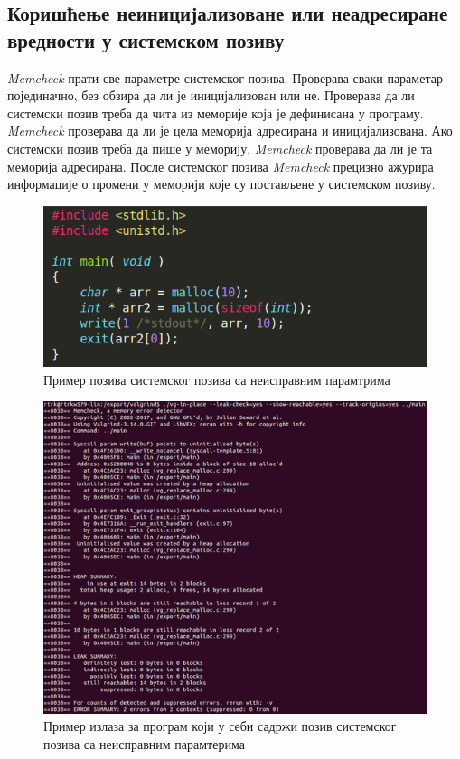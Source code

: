 \documentclass[12pt,oneside]{memoir}
\begin{document}
\subsection{Коришћење неиницијализоване или неадресиране вредности у системском позиву}

\indent \textit{Memcheck} прати све параметре системског позива.  Проверава сваки параметар појединачно, без обзира да ли је иницијализован или не. Проверава да ли системски позив треба да чита из меморије која је дефинисана у програму. \textit{Memcheck} проверава да ли је цела меморија адресирана и иницијализована. Ако системски позив треба да пише у меморију, \textit{Memcheck} проверава да ли је та меморија адресирана. После системског позива \textit{Memcheck} прецизно ажурира информације о промени у меморији које су постављене у системском позиву.

\begin{figure}[h!]
\begin{center}
\includegraphics[scale=0.75]{slika3.png}
\end{center}
\caption{Пример позива системског позива са неисправним парамтрима}
\label{fig:main1}
\end{figure}



\begin{figure}[h!]
\begin{center}
\includegraphics[scale=0.75]{slika4.png}
\end{center}
\caption{Пример излаза за програм који у себи садржи позив системског позива са неисправним парамтерима}
\label{fig:memcheck1}
\end{figure}
\end{document}

